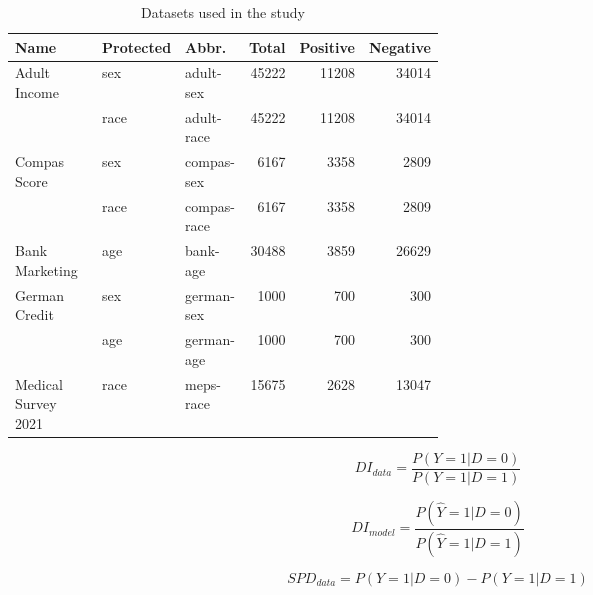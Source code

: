 \documentclass{article}
\begin{document}
\begin{table}[htb]
  \centering
  \caption{Datasets used in the study}
  \begin{tabular}{p{0.3\linewidth} p{0.1\linewidth} p{0.1\linewidth} r r r}
    \toprule

    \textbf{Name} & \textbf{Protected} & \textbf{Abbr.} &
    \textbf{Total} & \textbf{Positive} & \textbf{Negative}\\

    \midrule

    \multirow{2}{*}{Adult Income \cite{CITEME}} & sex & adult-sex & 45222 & 11208 &
    34014\\
      & race & adult-race & 45222 & 11208 & 34014\\
    \multirow{2}{*}{Compas Score \cite{CITEME}} & sex & compas-sex &
    6167 & 3358 & 2809\\
      & race & compas-race & 6167 & 3358 & 2809\\
    Bank Marketing \cite{CITEME} & age & bank-age & 30488 & 3859 &
    26629\\
    \multirow{2}{*}{German Credit \cite{CITEME}} & sex & german-sex &
    1000 & 700 & 300\\
      & age & german-age & 1000 & 700 & 300\\
    Medical Survey 2021 \cite{CITEME} & race & meps-race & 15675 &
    2628 & 13047\\
    \bottomrule
  \end{tabular}
  \label{tab:datasets}
\end{table}



\begin{equation}
  DI_{data} = \frac{P(Y=1|D=0)}{P(Y=1|D=1)}
  \label{eq:di-data}
\end{equation}

\begin{equation}
  DI_{model} = \frac{P(\hat{Y}=1|D=0)}{P(\hat{Y}=1|D=1)}
  \label{eq:di-model}
\end{equation}

\begin{equation}
  SPD_{data} = P(Y=1|D=0)-P(Y=1|D=1)
  \label{eq:spd-data}
\end{equation}
\end{document}
